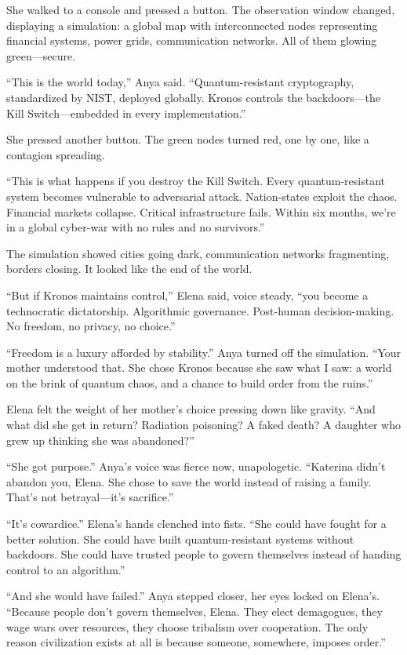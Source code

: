 She walked to a console and pressed a button. The observation window changed, displaying a simulation: a global map with interconnected nodes representing financial systems, power grids, communication networks. All of them glowing green---secure.

``This is the world today,'' Anya said. ``Quantum-resistant cryptography, standardized by NIST, deployed globally. Kronos controls the backdoors---the Kill Switch---embedded in every implementation.''

She pressed another button. The green nodes turned red, one by one, like a contagion spreading.

``This is what happens if you destroy the Kill Switch. Every quantum-resistant system becomes vulnerable to adversarial attack. Nation-states exploit the chaos. Financial markets collapse. Critical infrastructure fails. Within six months, we're in a global cyber-war with no rules and no survivors.''

The simulation showed cities going dark, communication networks fragmenting, borders closing. It looked like the end of the world.

``But if Kronos maintains control,'' Elena said, voice steady, ``you become a technocratic dictatorship. Algorithmic governance. Post-human decision-making. No freedom, no privacy, no choice.''

``Freedom is a luxury afforded by stability.'' Anya turned off the simulation. ``Your mother understood that. She chose Kronos because she saw what I saw: a world on the brink of quantum chaos, and a chance to build order from the ruins.''

Elena felt the weight of her mother's choice pressing down like gravity. ``And what did she get in return? Radiation poisoning? A faked death? A daughter who grew up thinking she was abandoned?''

``She got purpose.'' Anya's voice was fierce now, unapologetic. ``Katerina didn't abandon you, Elena. She chose to save the world instead of raising a family. That's not betrayal---it's sacrifice.''

``It's cowardice.'' Elena's hands clenched into fists. ``She could have fought for a better solution. She could have built quantum-resistant systems without backdoors. She could have trusted people to govern themselves instead of handing control to an algorithm.''

``And she would have failed.'' Anya stepped closer, her eyes locked on Elena's. ``Because people don't govern themselves, Elena. They elect demagogues, they wage wars over resources, they choose tribalism over cooperation. The only reason civilization exists at all is because someone, somewhere, imposes order.''

